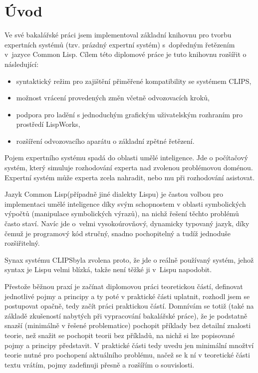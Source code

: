 \section{Úvod}
Ve své bakalářské práci jsem implementoval základní knihovnu pro tvorbu
expertních systémů (tzv. prázdný expertní systém) s~dopředným řetězením v~jazyce
Common Lisp. Cílem této diplomové práce je tuto knihovnu rozšířit o následující:
\begin{itemize}
  \item syntaktický režim pro zajištění přiměřené kompatibility se systémem
    CLIPS,
  \item možnost vrácení provedených změn včetně odvozovacích kroků,
  \item podpora pro ladění s jednoduchým grafickým uživatelským rozhraním pro
    prostředí LispWorks\texttrademark,
  \item rozšíření odvozovacího aparátu o základní zpětné řetězení.
\end{itemize}

Pojem expertního systému spadá do oblasti umělé inteligence. Jde o počítačový
systém, který simuluje rozhodování experta nad zvolenou problémovou doménou.
Expertní systém může experta zcela nahradit, nebo mu při rozhodování asistovat.

Jazyk Common Lisp\footnotemark[1] (případně jiné dialekty Lispu) je častou volbou
pro implementaci umělé inteligence díky svým schopnostem v oblasti symbolických
výpočtů (manipulace symbolických výrazů), na nichž řešení těchto problémů často
staví. Navíc jde o~velmi vysokoúrovňový, dynamicky typovaný jazyk, díky čemuž je
programový kód stručný, snadno pochopitelný a tudíž jednoduše rozšiřitelný.

Synax systému CLIPS\footnotemark[2] byla zvolena proto, že jde o reálně používaný
systém\footnotemark[3], jehož syntax je Lispu velmi blízká, takže není těžké ji
v~Lispu napodobit.

Přestože běžnou praxí je začínat diplomovou práci teoretickou částí, definovat
jednotlivé pojmy a principy a ty poté v praktické části uplatnit, rozhodl jsem
se postupovat opačně, tedy začít práci praktickou částí. Domnívám se totiž (také
na základě zkušeností nabytých při vypracování bakalářské práce), že je podstatně
snazší (minimálně v řešené problematice) pochopit příklady bez detailní znalosti
teorie, než snažit se pochopit teorii bez příkladů, na nichž si lze popisované
pojmy a principy představit. V praktické části tedy uvedu jen minimální množtví
teorie nutné pro pochopení aktuálního problému, načež se k ní v teoretické části
textu vrátím, pojmy zadefinuji přesně a rozšířím o souvislosti.

